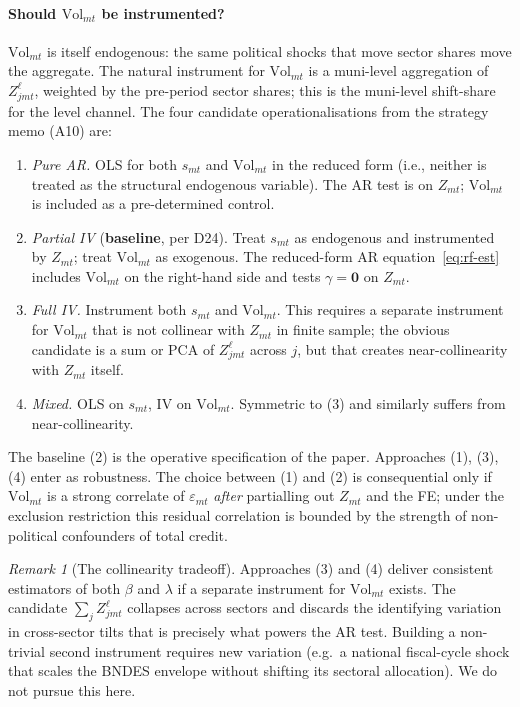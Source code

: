 \documentclass{article}
\newcommand{\Vol}{\mathrm{Vol}}
\newcommand{\bzero}{\mathbf{0}}
\theoremstyle{plain}
\theoremstyle{definition}
\theoremstyle{remark}
\newtheorem{remark}{Remark}
\begin{document}
\paragraph{Should $\Vol_{mt}$ be instrumented?}
$\Vol_{mt}$ is itself endogenous: the same political shocks that move sector
shares move the aggregate. The natural instrument for $\Vol_{mt}$ is a
muni-level aggregation of $Z^{\ell}_{jmt}$, weighted by the pre-period sector
shares; this is the muni-level shift-share for the level channel. The four
candidate operationalisations from the strategy memo (A10) are:
\begin{enumerate}[leftmargin=*,nosep]
\item \emph{Pure AR.} OLS for both $s_{mt}$ and $\Vol_{mt}$ in the reduced form
  (i.e., neither is treated as the structural endogenous variable). The AR test
  is on $Z_{mt}$; $\Vol_{mt}$ is included as a pre-determined control.
\item \emph{Partial IV} (\textbf{baseline}, per D24). Treat $s_{mt}$ as
  endogenous and instrumented by $Z_{mt}$; treat $\Vol_{mt}$ as exogenous.
  The reduced-form AR equation~\eqref{eq:rf-est} includes $\Vol_{mt}$ on the
  right-hand side and tests $\gamma=\bzero$ on $Z_{mt}$.
\item \emph{Full IV.} Instrument both $s_{mt}$ and $\Vol_{mt}$. This requires a
  separate instrument for $\Vol_{mt}$ that is not collinear with $Z_{mt}$ in
  finite sample; the obvious candidate is a sum or PCA of $Z^{\ell}_{jmt}$
  across $j$, but that creates near-collinearity with $Z_{mt}$ itself.
\item \emph{Mixed.} OLS on $s_{mt}$, IV on $\Vol_{mt}$. Symmetric to (3) and
  similarly suffers from near-collinearity.
\end{enumerate}
The baseline (2) is the operative specification of the
paper. Approaches (1), (3), (4) enter as robustness. The choice between (1)
and (2) is consequential only if $\Vol_{mt}$ is a strong correlate of
$\varepsilon_{mt}$ \emph{after} partialling out $Z_{mt}$ and the FE; under the
exclusion restriction this residual correlation is bounded by the strength of
non-political confounders of total credit.

\begin{remark}[The collinearity tradeoff]
Approaches (3) and (4) deliver consistent estimators of both $\beta$ and
$\lambda$ if a separate instrument for $\Vol_{mt}$ exists. The candidate
$\sum_{j}Z^{\ell}_{jmt}$ collapses across sectors and discards the
identifying variation in cross-sector tilts that is precisely what powers the
AR test. Building a non-trivial second instrument requires new variation
(e.g.\ a national fiscal-cycle shock that scales the BNDES envelope without
shifting its sectoral allocation). We do not pursue this here.
\end{remark}
\end{document}
